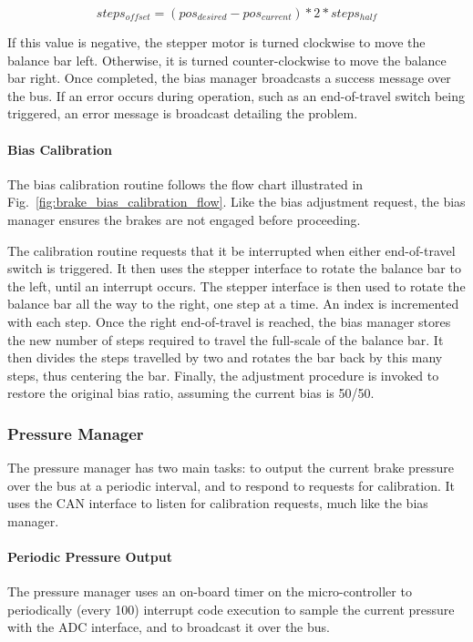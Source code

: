 \[
steps_{offset} = (pos_{desired} - pos_{current}) * 2 * steps_{half}
\]

If this value is negative, the stepper motor is turned clockwise to move the balance bar left. Otherwise, it is turned counter-clockwise to move the balance bar right. Once completed, the bias manager broadcasts a success message over the bus. If an error occurs during operation, such as an end-of-travel switch being triggered, an error message is broadcast detailing the problem. 

\paragraph{Bias Calibration}

The bias calibration routine follows the flow chart illustrated in Fig.\ \ref{fig:brake_bias_calibration_flow}. Like the bias adjustment request, the bias manager ensures the brakes are not engaged before proceeding.

The calibration routine requests that it be interrupted when either end-of-travel switch is triggered. It then uses the stepper interface to rotate the balance bar to the left, until an interrupt occurs. The stepper interface is then used to rotate the balance bar all the way to the right, one step at a time. An index is incremented with each step. Once the right end-of-travel is reached, the bias manager stores the new number of steps required to travel the full-scale of the balance bar. It then divides the steps travelled by two and rotates the bar back by this many steps, thus centering the bar. Finally, the adjustment procedure is invoked to restore the original bias ratio, assuming the current bias is 50/50.

\subsubsection{Pressure Manager}

The pressure manager has two main tasks: to output the current brake pressure over the bus at a periodic interval, and to respond to requests for calibration. It uses the CAN interface to listen for calibration requests, much like the bias manager. 

\paragraph{Periodic Pressure Output}

The pressure manager uses an on-board timer on the micro-controller to periodically (every \unit{100}{\milli\second}) interrupt code execution to sample the current pressure with the ADC interface, and to broadcast it over the bus. 


